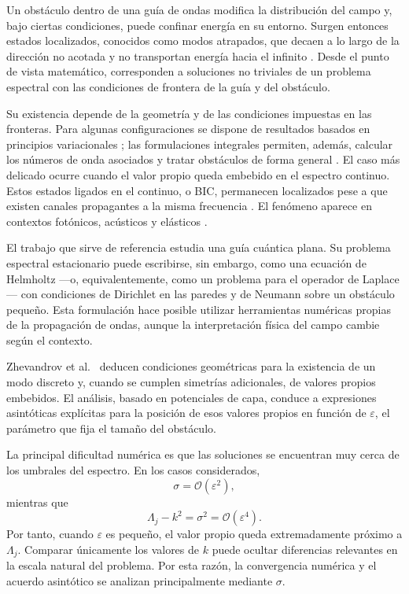 \documentclass[11pt]{article}
\begin{document}
Un obstáculo dentro de una guía de ondas modifica la distribución del campo y, bajo ciertas condiciones, puede confinar energía en su entorno. Surgen entonces estados localizados, conocidos como modos atrapados, que decaen a lo largo de la dirección no acotada y no transportan energía hacia el infinito \cite{Khallaf2000,Linton1992}. Desde el punto de vista matemático, corresponden a soluciones no triviales de un problema espectral con las condiciones de frontera de la guía y del obstáculo.

Su existencia depende de la geometría y de las condiciones impuestas en las fronteras. Para algunas configuraciones se dispone de resultados basados en principios variacionales \cite{Evans1994}; las formulaciones integrales permiten, además, calcular los números de onda asociados y tratar obstáculos de forma general \cite{Linton1992}. El caso más delicado ocurre cuando el valor propio queda embebido en el espectro continuo. Estos estados ligados en el continuo, o BIC, permanecen localizados pese a que existen canales propagantes a la misma frecuencia \cite{Koshelev2023,Kang2023}. El fenómeno aparece en contextos fotónicos, acústicos y elásticos \cite{MartiSabate2024,Cao2021}.

El trabajo que sirve de referencia \cite{Zhevandrov2025} estudia una guía cuántica plana. Su problema espectral estacionario puede escribirse, sin embargo, como una ecuación de Helmholtz ---o, equivalentemente, como un problema para el operador de Laplace--- con condiciones de Dirichlet en las paredes y de Neumann sobre un obstáculo pequeño. Esta formulación hace posible utilizar herramientas numéricas propias de la propagación de ondas, aunque la interpretación física del campo cambie según el contexto.

Zhevandrov et al.~\cite{Zhevandrov2025} deducen condiciones geométricas para la existencia de un modo discreto y, cuando se cumplen simetrías adicionales, de valores propios embebidos. El análisis, basado en potenciales de capa, conduce a expresiones asintóticas explícitas para la posición de esos valores propios en función de \(\varepsilon\), el parámetro que fija el tamaño del obstáculo.

La principal dificultad numérica es que las soluciones se encuentran muy cerca de los umbrales del espectro. En los casos considerados,
\[
\sigma=\mathcal{O}(\varepsilon^2),
\]
mientras que
\[
\Lambda_j-k^2=\sigma^2=\mathcal{O}(\varepsilon^4).
\]
Por tanto, cuando \(\varepsilon\) es pequeño, el valor propio queda extremadamente próximo a \(\Lambda_j\). Comparar únicamente los valores de \(k\) puede ocultar diferencias relevantes en la escala natural del problema. Por esta razón, la convergencia numérica y el acuerdo asintótico se analizan principalmente mediante \(\sigma\).
\end{document}
